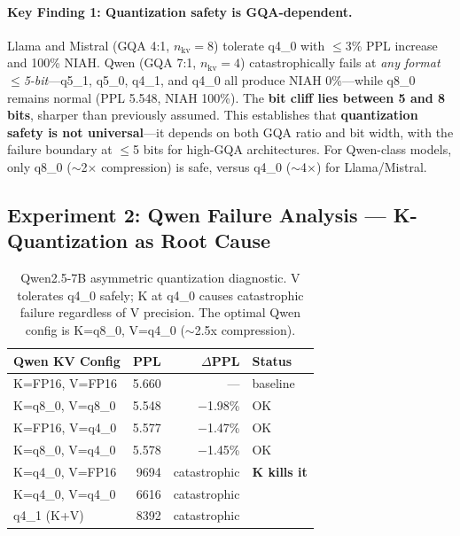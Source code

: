\paragraph{Key Finding 1: Quantization safety is GQA-dependent.}
Llama and Mistral (GQA 4:1, $n_\text{kv}=8$) tolerate q4\_0 with $\leq$3\% PPL increase and 100\% NIAH. Qwen (GQA 7:1, $n_\text{kv}=4$) catastrophically fails at \emph{any format $\leq$5-bit}---q5\_1, q5\_0, q4\_1, and q4\_0 all produce NIAH 0\%---while q8\_0 remains normal (PPL 5.548, NIAH 100\%). The \textbf{bit cliff lies between 5 and 8 bits}, sharper than previously assumed. This establishes that \textbf{quantization safety is not universal}---it depends on both GQA ratio and bit width, with the failure boundary at $\leq$5 bits for high-GQA architectures. For Qwen-class models, only q8\_0 ($\sim$2$\times$ compression) is safe, versus q4\_0 ($\sim$4$\times$) for Llama/Mistral.

\subsection{Experiment 2: Qwen Failure Analysis --- K-Quantization as Root Cause}
\label{sec:exp-qwen}

\begin{table}[h]
\centering
\begin{tabular}{lrrl}
\toprule
\textbf{Qwen KV Config} & \textbf{PPL} & \textbf{$\Delta$PPL} & \textbf{Status} \\
\midrule
K=FP16, V=FP16 & 5.660 & --- & baseline \\
K=q8\_0, V=q8\_0 & 5.548 & $-$1.98\% & OK \\
K=FP16, V=q4\_0 & 5.577 & $-$1.47\% & OK \\
K=q8\_0, V=q4\_0 & 5.578 & $-$1.45\% & OK \\
\midrule
K=q4\_0, V=FP16 & 9694 & catastrophic & \textbf{K kills it} \\
K=q4\_0, V=q4\_0 & 6616 & catastrophic & \\
q4\_1 (K+V) & 8392 & catastrophic & \\
\bottomrule
\end{tabular}
\caption{Qwen2.5-7B asymmetric quantization diagnostic. V tolerates q4\_0 safely; K at q4\_0 causes catastrophic failure regardless of V precision. The optimal Qwen config is K=q8\_0, V=q4\_0 ($\sim$2.5x compression).}
\label{tab:qwen-diagnostic}
\end{table}


